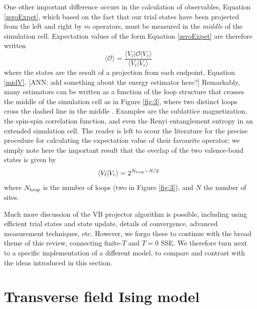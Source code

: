 \documentclass[vecphys]{svmult}
\begin{document}
One other important difference occurs in the calculation of observables, Equation \ref{zeroExpet}, which based on the fact that our trial states have been projected from the left and right by $m$ operators, must be measured in the {\em middle} of the simulation cell.
Expectation values of the form Equation \ref{zeroExpet} are therefore written
\begin{equation}
\langle \mathcal{O} \rangle = \frac{\langle V_{\ell} | \mathcal{O} | V_r \rangle}{\langle V_{\ell} |   V_r \rangle}
\end{equation}
where the states are the result of a projection from each endpoint, Equation \ref{midV}.  
{\color{red}[ANN: add something about the energy estimator here?]}
Remarkably, many estimators can be written as a function of the loop structure that crosses the middle of the simulation cell as in Figure \ref{fig:3}, where two distinct loops cross the dashed line in the middle \cite{Melko:Beach06,Melko:AWSBeach,Melko:Sandvik10a}.  Examples are the sublattice magnetization, the spin-spin correlation function, and even the Renyi entanglement entropy in an extended simulation cell.  The reader is left to scour the literature for the precise procedure for calculating the expectation value of their favourite operator; we simply note here the important result that 
the overlap of the two valence-bond states is given by
\begin{equation}
\langle V_{\ell} |   V_r \rangle = 2^{N_{\rm loop} - N/2}
\end{equation}
where $N_{\rm loop}$ is the number of loops (two in Figure \ref{fig:3}), and $N$ the number of sites. 

Much more discussion of the VB projector algorithm is possible, including using efficient trial states and state update, details of convergence, advanced measurement techniques, etc. However, we forgo these to continue with the broad theme of this review, connecting finite-$T$ and $T=0$ SSE.  We therefore turn next to a specific implementation of a different model, to compare and contrast with the ideas introduced in this section.


\section{Transverse field Ising model} \label{Melko:TFIMSec}
\end{document}
